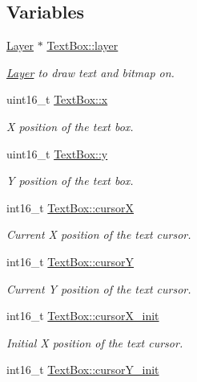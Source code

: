 \subsection*{Variables}
\begin{DoxyCompactItemize}
\item 
\mbox{\hyperlink{struct_layer}{Layer}} $\ast$ \mbox{\hyperlink{group__textbox_ga6e30e306c0894a9cd95ffe51fa878c5f}{Text\+Box\+::layer}}
\begin{DoxyCompactList}\small\item\em \mbox{\hyperlink{struct_layer}{Layer}} to draw text and bitmap on. \end{DoxyCompactList}\item 
uint16\+\_\+t \mbox{\hyperlink{group__textbox_ga61e7ab17d9106687e4cc5deb7b801c4f}{Text\+Box\+::x}}
\begin{DoxyCompactList}\small\item\em X position of the text box. \end{DoxyCompactList}\item 
uint16\+\_\+t \mbox{\hyperlink{group__textbox_ga7de1ea2ec650f3160a7fcbf21f5fe606}{Text\+Box\+::y}}
\begin{DoxyCompactList}\small\item\em Y position of the text box. \end{DoxyCompactList}\item 
int16\+\_\+t \mbox{\hyperlink{group__textbox_gab8a4ab22fd92b094d7e20da5dd4c6ecb}{Text\+Box\+::cursorX}}
\begin{DoxyCompactList}\small\item\em Current X position of the text cursor. \end{DoxyCompactList}\item 
int16\+\_\+t \mbox{\hyperlink{group__textbox_ga486d45b3fcf48020cc4fef908d1a32ec}{Text\+Box\+::cursorY}}
\begin{DoxyCompactList}\small\item\em Current Y position of the text cursor. \end{DoxyCompactList}\item 
int16\+\_\+t \mbox{\hyperlink{group__textbox_gaa505c0e1aa35305c1af3b71a5b761393}{Text\+Box\+::cursor\+X\+\_\+init}}
\begin{DoxyCompactList}\small\item\em Initial X position of the text cursor. \end{DoxyCompactList}\item 
int16\+\_\+t \mbox{\hyperlink{group__textbox_ga9dc197044dc20a082831cc2f5aea2661}{Text\+Box\+::cursor\+Y\+\_\+init}}

\end{DoxyCompactItemize}
